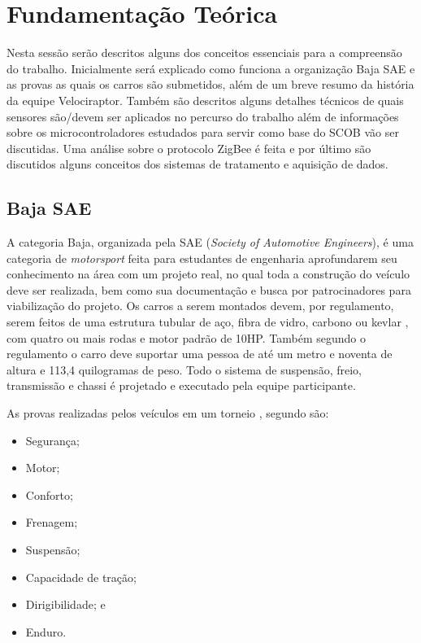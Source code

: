 \chapter{Fundamentação Teórica}
	\label{ch:fundamentacao}
Nesta sessão serão descritos alguns dos conceitos essenciais para a compreensão do trabalho. Inicialmente será explicado como funciona a organização Baja SAE e as provas as quais os carros são submetidos, além de um breve resumo da história da equipe Velociraptor. Também são descritos alguns detalhes técnicos de quais sensores são/devem ser aplicados no percurso do trabalho além de informações sobre os microcontroladores estudados para servir como base do SCOB vão ser discutidas. Uma análise sobre o protocolo ZigBee é feita e por último são discutidos alguns conceitos dos sistemas de tratamento e aquisição de dados.

\section{Baja SAE}
A categoria Baja, organizada pela SAE (\textit{Society of Automotive Engineers}), é uma categoria de \textit{motorsport} feita para estudantes de engenharia aprofundarem seu conhecimento na área com um projeto real, no qual toda a construção do veículo deve ser realizada, bem como sua documentação e busca por patrocinadores para viabilização do projeto. Os carros a serem montados devem, por regulamento, \cite{regulamentobajasae} serem feitos de uma estrutura tubular de aço, fibra de vidro, carbono ou kevlar \cite{projetoMiniBaja2006}, com quatro ou mais rodas e motor padrão de 10HP. Também segundo o regulamento o carro deve suportar uma pessoa de até um metro e noventa de altura e 113,4 quilogramas de peso. Todo o sistema de suspensão, freio, transmissão e chassi é projetado e executado pela equipe participante.  

As provas realizadas pelos veículos em um torneio , segundo \cite{bajasae} são:
\begin{itemize}
	\item Segurança;
	\item Motor;
	\item Conforto;
	\item Frenagem;
	\item Suspensão;
	\item Capacidade de tração;
	\item Dirigibilidade; e
	\item Enduro.
\end{itemize}

